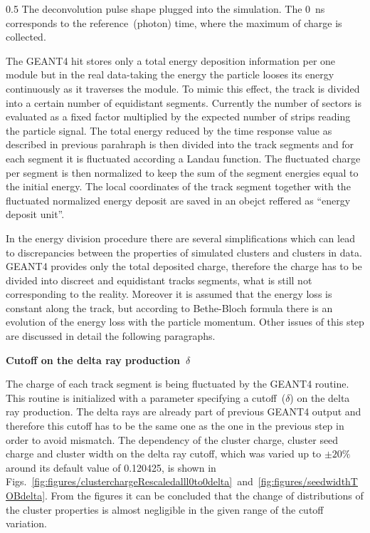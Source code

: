                  {0.5}       %
                 { The deconvolution pulse shape plugged into the simulation. The 0~ns corresponds to the reference~(photon) time, where the maximum of charge is collected.}

The GEANT4 hit stores only a total energy deposition information per one module but in the real data-taking the energy the particle looses its energy continuously as it traverses the module. To mimic this effect, the track is divided into a certain number of equidistant segments. Currently the number of sectors is evaluated as a fixed factor multiplied by the expected number of strips reading the particle signal. The total energy reduced by the time response value as described in previous parahraph is then divided into the track segments and for each segment it is fluctuated according a Landau function. The fluctuated charge per segment is then normalized to keep the sum of the segment energies equal to the initial energy. The local coordinates of the track segment together with the fluctuated normalized energy deposit are saved in an obejct reffered as ``energy deposit unit''.

In the energy division procedure there are several simplifications which can lead to discrepancies between the properties of simulated clusters and clusters in data. GEANT4 provides only the total deposited charge, therefore the charge has to be divided into discreet and equidistant tracks segments, what is still not corresponding to the reality. Moreover it is assumed that the energy loss is constant along the track, but according to Bethe-Bloch formula there is an evolution of the energy loss with the particle momentum. Other issues of this step are discussed in detail the following paragraphs.

\textbf{Cutoff on the delta ray production~$\delta$ }

The charge of each track segment is being fluctuated by the GEANT4 routine. This routine is initialized with a parameter specifying a cutoff~($\delta$) on the delta ray production. The delta rays are already part of previous GEANT4 output and therefore this cutoff has to be the same one as the one in the previous step in order to avoid mismatch. The dependency of the cluster charge, cluster seed charge and cluster width on the delta ray cutoff, which was varied up to $\pm 20\%$ around its default value of 0.120425, is shown in Figs.~\ref{fig:figures/clusterchargeRescaledalll0to0delta}~and~\ref{fig:figures/seedwidthTOBdelta}. From the figures it can be concluded that the change of distributions of the cluster properties is almost negligible in the given range of the cutoff variation. 

